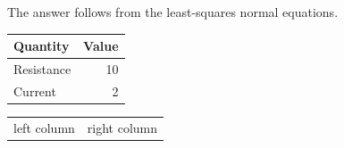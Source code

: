 \documentclass[11pt]{article}
\begin{document}

The answer follows from the least-squares normal equations.

\begin{DataTable}[table/header-rows={1}]
\begin{tabular}{|l|r|}
\hline
Quantity & Value \\
\hline
Resistance & 10 \\
Current & 2 \\
\hline
\end{tabular}
\end{DataTable}

\begin{LayoutTable}
\begin{tabular}{cc}
left column & right column \\
\end{tabular}
\end{LayoutTable}
\end{document}

